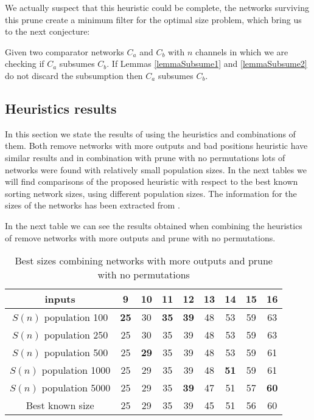 \documentclass[../main.tex]{subfiles}
\begin{document}
	We actually suspect that this heuristic could be complete, the networks surviving this prune create a minimum filter for the optimal size problem, which bring us to the next conjecture:
	
	\begin{conjecture}
		Given two comparator networks $C_a$ and $C_b$ with $n$ channels in which we are checking if $C_a$ subsumes $C_b$. If Lemmas \ref{lemmaSubsume1} and \ref{lemmaSubsume2} do not discard the subsumption then $C_a$ subsumes $C_b$.
	\end{conjecture}

	\subsection{Heuristics results}
	In this section we state the results of using the heuristics and combinations of them. Both remove networks with more outputs and bad positions heuristic have similar results and in combination with prune with no permutations lots of networks were found with relatively small population sizes. In the next tables we will find comparisons of the proposed heuristic with respect to the best known sorting network sizes, using different population sizes. The information for the sizes of the networks has been extracted from \cite{bertdobbelaere}.
	
	In the next table we can see the results obtained when combining the heuristics of remove networks with more outputs and prune with no permutations. 
	\begin{table}[H]
		\begin{center}
		\begin{tabular}{|c | c c c c c c c c|} 
			\hline
			inputs & 9 & 10 & 11 & 12 & 13 & 14 & 15 & 16  \\ [0.5ex] 
			\hline\hline
			$S(n)$ population 100 & \textbf{25} & 30 & \textbf{35} & \textbf{39} & 48 & 53 & 59 & 63 \\ [1ex]
			\hline
			$S(n)$ population 250  & 25 & 30 & 35 & 39 & 48 & 53 & 59 & 63 \\  [1ex] 
			\hline
			$S(n)$ population 500 & 25 & \textbf{29} & 35 & 39 & 48 & 53 & 59 & 61 \\  [1ex] 
			\hline
			$S(n)$ population 1000  & 25 & 29 & 35 & 39 & 48 & \textbf{51} & 59 & 61 \\  [1ex] 
			\hline
			$S(n)$ population 5000  & 25 & 29 & 35 & \textbf{39} & 47 & 51 & 57 & \textbf{60} \\  [1ex] 
			\hline
			Best known size & 25 & 29 & 35 & 39 & 45 & 51 & 56 & 60 \\  [1ex] 
			\hline
		\end{tabular}
		\end{center}	
		\caption{Best sizes combining networks with more outputs and prune with no permutations}
	\end{table}
\end{document}
